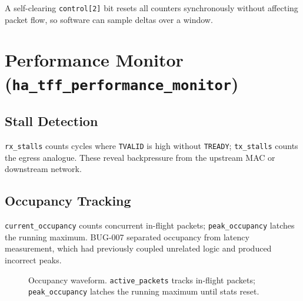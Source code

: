 \documentclass[12pt,twoside,openright]{book}
\begin{document}
A self-clearing \texttt{control[2]} bit resets all counters synchronously without affecting packet
flow, so software can sample deltas over a window.

\section{Performance Monitor (\texttt{ha\_tff\_performance\_monitor})}

\subsection{Stall Detection}

\texttt{rx\_stalls} counts cycles where \texttt{TVALID} is high without \texttt{TREADY};
\texttt{tx\_stalls} counts the egress analogue. These reveal backpressure from the upstream MAC or
downstream network.

\subsection{Occupancy Tracking}

\texttt{current\_occupancy} counts concurrent in-flight packets; \texttt{peak\_occupancy} latches
the running maximum. BUG-007 separated occupancy from latency measurement, which had previously
coupled unrelated logic and produced incorrect peaks.

\begin{figure}[H]
\centering
\footnotesize
{}
\caption{Occupancy waveform. \texttt{active\_packets} tracks in-flight packets; \texttt{peak\_occupancy}
latches the running maximum until stats reset.}
\label{fig:occupancy}
\end{figure}
\end{document}
